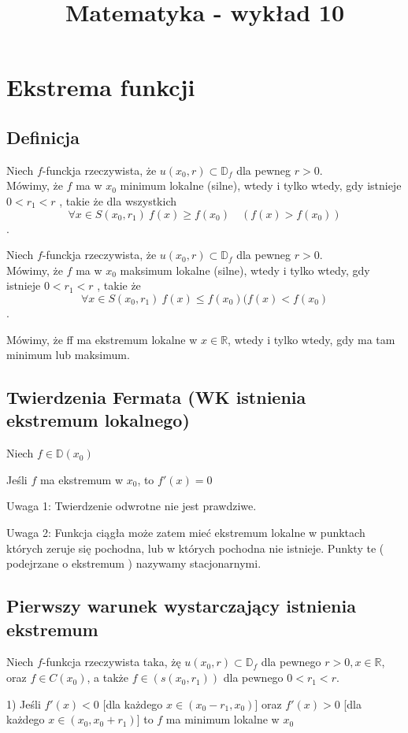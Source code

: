 \documentclass{article}
\title{Matematyka - wykład 10}
\begin{document}
\maketitle
\section{Ekstrema funkcji}
\subsection{Definicja}
Niech $f$-funckja rzeczywista, że $u(x_0,r) \subset  \mathbb{D}_f$ dla pewneg $r > 0$.\\
Mówimy, że $f$ ma w $x_0$ minimum lokalne (silne), wtedy i tylko wtedy, gdy istnieje $0<r_1<r$ , takie że
dla wszystkich $$\forall x \in S(x_0,r_1) \ f(x) \geq f(x_0) \quad ( f(x) > f(x_0))$$.

Niech $f$-funckja rzeczywista, że $u(x_0,r) \subset  \mathbb{D}_f$ dla pewneg $r > 0$.\\
Mówimy, że $f$ ma w $x_0$ maksimum lokalne (silne), wtedy i tylko wtedy, gdy istnieje $0<r_1<r$ , takie że
$$\forall x \in S(x_0,r_1) \ f(x) \leq f(x_0) ( f(x) < f(x_0)$$.

Mówimy, że ff ma ekstremum lokalne w $x \in \mathbb{R}$, wtedy i tylko wtedy, gdy ma tam minimum lub maksimum.
\subsection{Twierdzenia Fermata (WK istnienia ekstremum lokalnego)}
Niech $f \in \mathbb{D}(x_0)$

Jeśli $f$ ma ekstremum w $x_0$, to $f'(x) = 0$

\bigskip
Uwaga 1: Twierdzenie odwrotne nie jest prawdziwe.

Uwaga 2: Funkcja ciągła może zatem mieć ekstremum lokalne w punktach których zeruje się pochodna, lub w których pochodna nie istnieje. Punkty te ( podejrzane o ekstremum ) nazywamy stacjonarnymi.

\subsection{ Pierwszy warunek wystarczający istnienia ekstremum }
Niech $f$-funkcja rzeczywista taka, żę $u(x_0,r) \subset \mathbb{D}_f$ dla pewnego $r>0 , x \in \mathbb{R}$, oraz $f \in C(x_0)$, a także $f \in (s(x_0,r_1))$ dla pewnego $0<r_1<r$.

1) Jeśli $f'(x) < 0$ [dla każdego $x \in (x_0 - r_1 , x_0)$] oraz $f'(x) > 0$ [dla każdego $x \in (x_0,x_0+r_1)$] to $f$ ma minimum lokalne w $x_0$
\end{document}
